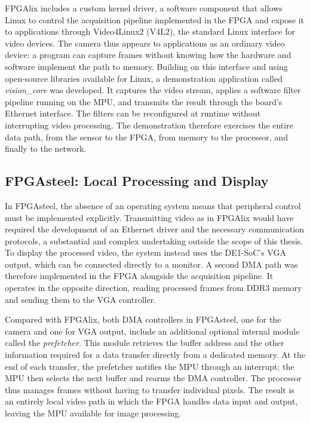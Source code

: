 FPGAlix includes a custom kernel driver, a software component that allows Linux to control the acquisition pipeline implemented in the FPGA and expose it to applications through Video4Linux2 (V4L2), the standard Linux interface for video devices. The camera thus appears to applications as an ordinary video device: a program can capture frames without knowing how the hardware and software implement the path to memory. Building on this interface and using open-source libraries available for Linux, a demonstration application called \emph{vision\_core} was developed. It captures the video stream, applies a software filter pipeline running on the MPU, and transmits the result through the board's Ethernet interface. The filters can be reconfigured at runtime without interrupting video processing. The demonstration therefore exercises the entire data path, from the sensor to the FPGA, from memory to the processor, and finally to the network.

\subsection{FPGAsteel: Local Processing and Display}

In FPGAsteel, the absence of an operating system means that peripheral control must be implemented explicitly. Transmitting video as in FPGAlix would have required the development of an Ethernet driver and the necessary communication protocols, a substantial and complex undertaking outside the scope of this thesis. To display the processed video, the system instead uses the DE1-SoC's VGA output, which can be connected directly to a monitor. A second DMA path was therefore implemented in the FPGA alongside the acquisition pipeline. It operates in the opposite direction, reading processed frames from DDR3 memory and sending them to the VGA controller.

Compared with FPGAlix, both DMA controllers in FPGAsteel, one for the camera and one for VGA output, include an additional optional internal module called the \emph{prefetcher}. This module retrieves the buffer address and the other information required for a data transfer directly from a dedicated memory. At the end of each transfer, the prefetcher notifies the MPU through an interrupt; the MPU then selects the next buffer and rearms the DMA controller. The processor thus manages frames without having to transfer individual pixels. The result is an entirely local video path in which the FPGA handles data input and output, leaving the MPU available for image processing.

